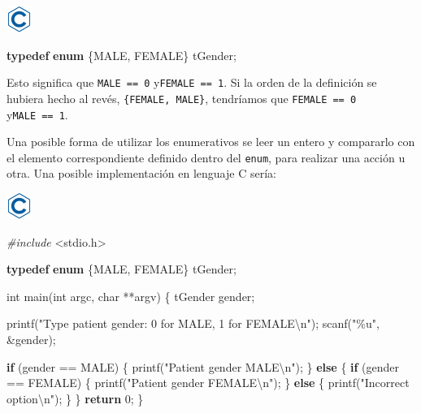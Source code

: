 \documentclass[
]{book}
\newenvironment{Shaded}{\begin{snugshade}}{\end{snugshade}}
\newcommand{\ControlFlowTok}[1]{\textcolor[rgb]{0.13,0.29,0.53}{\textbf{#1}}}
\newcommand{\DataTypeTok}[1]{\textcolor[rgb]{0.13,0.29,0.53}{#1}}
\newcommand{\DecValTok}[1]{\textcolor[rgb]{0.00,0.00,0.81}{#1}}
\newcommand{\ImportTok}[1]{#1}
\newcommand{\KeywordTok}[1]{\textcolor[rgb]{0.13,0.29,0.53}{\textbf{#1}}}
\newcommand{\NormalTok}[1]{#1}
\newcommand{\PreprocessorTok}[1]{\textcolor[rgb]{0.56,0.35,0.01}{\textit{#1}}}
\newcommand{\SpecialCharTok}[1]{\textcolor[rgb]{0.00,0.00,0.00}{#1}}
\newcommand{\StringTok}[1]{\textcolor[rgb]{0.31,0.60,0.02}{#1}}
\begin{document}
\includegraphics{./img/c.png}

\begin{Shaded}
\begin{Highlighting}[]
\KeywordTok{typedef} \KeywordTok{enum}\NormalTok{ \{MALE, FEMALE\} tGender;}
\end{Highlighting}
\end{Shaded}

Esto significa que \texttt{MALE\ ==\ 0} y\texttt{FEMALE\ ==\ 1}. Si la orden de la definición se hubiera hecho al revés, \texttt{\{FEMALE,\ MALE\}}, tendríamos que \texttt{FEMALE\ ==\ 0} y\texttt{MALE\ ==\ 1}.

Una posible forma de utilizar los enumerativos se leer un entero y compararlo con el elemento correspondiente definido dentro del \texttt{enum}, para realizar una acción u otra. Una posible implementación en lenguaje C sería:

\includegraphics{./img/c.png}

\begin{Shaded}
\begin{Highlighting}[]
\PreprocessorTok{\#include }\ImportTok{\textless{}stdio.h\textgreater{}}

\KeywordTok{typedef} \KeywordTok{enum}\NormalTok{ \{MALE, FEMALE\} tGender;}

\DataTypeTok{int}\NormalTok{ main(}\DataTypeTok{int}\NormalTok{ argc, }\DataTypeTok{char}\NormalTok{ **argv) \{}
\NormalTok{    tGender gender;}

\NormalTok{    printf(}\StringTok{"Type patient gender: 0 for MALE, 1 for FEMALE}\SpecialCharTok{\textbackslash{}n}\StringTok{"}\NormalTok{);}
\NormalTok{    scanf(}\StringTok{"\%u"}\NormalTok{, \&gender);}

    \ControlFlowTok{if}\NormalTok{ (gender == MALE) \{}
\NormalTok{        printf(}\StringTok{"Patient gender MALE}\SpecialCharTok{\textbackslash{}n}\StringTok{"}\NormalTok{);}
\NormalTok{    \} }\ControlFlowTok{else}\NormalTok{ \{}
        \ControlFlowTok{if}\NormalTok{ (gender == FEMALE) \{}
\NormalTok{            printf(}\StringTok{"Patient gender FEMALE}\SpecialCharTok{\textbackslash{}n}\StringTok{"}\NormalTok{);}
\NormalTok{        \} }\ControlFlowTok{else}\NormalTok{ \{}
\NormalTok{            printf(}\StringTok{"Incorrect option}\SpecialCharTok{\textbackslash{}n}\StringTok{"}\NormalTok{);}
\NormalTok{        \}}
\NormalTok{    \}}
    \ControlFlowTok{return} \DecValTok{0}\NormalTok{;}
\NormalTok{\}}
\end{Highlighting}
\end{Shaded}
\end{document}
